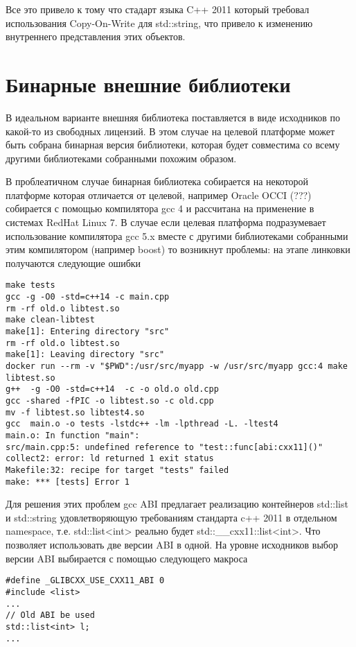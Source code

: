 \documentclass[14pt,a4paper]{article}
\begin{document}
Все это привело к тому что стадарт языка C++ 2011 который требовал
использования Copy-On-Write для std::string, что привело к изменению
внутреннего представления этих объектов.

\section{Бинарные внешние библиотеки}

В идеальном варианте внешняя библиотека поставляется в виде исходников
по какой-то из свободных лицензий. В этом случае на целевой
платформе может быть собрана бинарная версия библиотеки, которая будет
совместима со всему другими библиотеками собранными похожим образом.

В проблеатичном случае бинарная библиотека собирается на некоторой
платформе которая отличается от целевой, например Oracle OCCI (???)
собирается с помощью компилятора gcc 4 и рассчитана на применение в
системах RedHat Linux 7. В случае если целевая платформа подразумевает
использование компилятора gcc 5.x вместе с другими библиотеками
собранными этим компилятором (например boost) то возникнут проблемы:
на этапе линковки получаются следующие ошибки

\begin{verbatim}
make tests
gcc -g -O0 -std=c++14 -c main.cpp
rm -rf old.o libtest.so
make clean-libtest
make[1]: Entering directory "src"
rm -rf old.o libtest.so
make[1]: Leaving directory "src"
docker run --rm -v "$PWD":/usr/src/myapp -w /usr/src/myapp gcc:4 make libtest.so
g++  -g -O0 -std=c++14  -c -o old.o old.cpp
gcc -shared -fPIC -o libtest.so -c old.cpp
mv -f libtest.so libtest4.so
gcc  main.o -o tests -lstdc++ -lm -lpthread -L. -ltest4
main.o: In function "main":
src/main.cpp:5: undefined reference to "test::func[abi:cxx11]()"
collect2: error: ld returned 1 exit status
Makefile:32: recipe for target "tests" failed
make: *** [tests] Error 1
\end{verbatim}

Для решения этих проблем gcc ABI предлагает реализацию контейнеров
std::list и std::string
удовлетворяющую требованиям стандарта c++ 2011 
 в отдельном namespace, т.е. std::list<int> реально будет 
std::\_\_cxx11::list<int>. Что позволяет использовать две версии ABI в
одной. На уровне исходников выбор версии ABI выбирается с помощью
следующего макроса
\begin{verbatim}
#define _GLIBCXX_USE_CXX11_ABI 0
#include <list>
...
// Old ABI be used
std::list<int> l;
...
\end{verbatim} 
\end{document}

